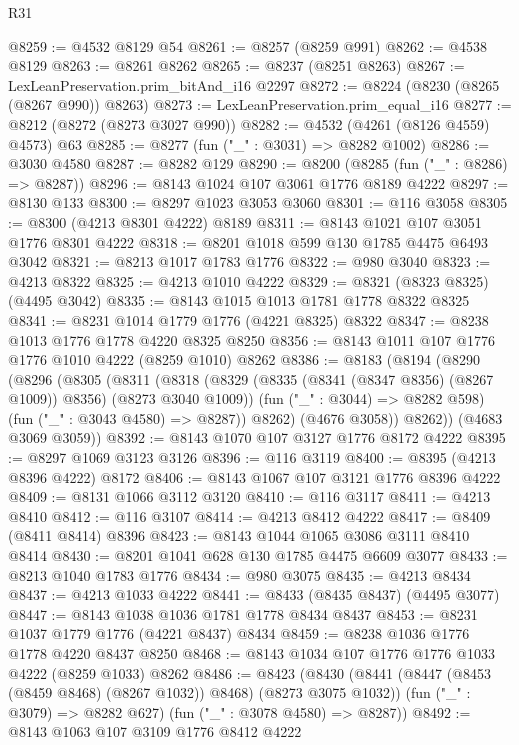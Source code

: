 \begin{lexlean}{R31}
\begin{coremodule}
@8259 := @4532 @8129 @54
@8261 := @8257 (@8259 @991)
@8262 := @4538 @8129
@8263 := @8261 @8262
@8265 := @8237 (@8251 @8263)
@8267 := LexLeanPreservation.prim_bitAnd_i16 @2297
@8272 := @8224 (@8230 (@8265 (@8267 @990)) @8263)
@8273 := LexLeanPreservation.prim_equal_i16
@8277 := @8212 (@8272 (@8273 @3027 @990))
@8282 := @4532 (@4261 (@8126 @4559) @4573) @63
@8285 := @8277 (fun ("_" : @3031) => @8282 @1002)
@8286 := @3030 @4580
@8287 := @8282 @129
@8290 := @8200 (@8285 (fun ("_" : @8286) => @8287))
@8296 := @8143 @1024 @107 @3061 @1776 @8189 @4222
@8297 := @8130 @133
@8300 := @8297 @1023 @3053 @3060
@8301 := @116 @3058
@8305 := @8300 (@4213 @8301 @4222) @8189
@8311 := @8143 @1021 @107 @3051 @1776 @8301 @4222
@8318 := @8201 @1018 @599 @130 @1785 @4475 @6493 @3042
@8321 := @8213 @1017 @1783 @1776
@8322 := @980 @3040
@8323 := @4213 @8322
@8325 := @4213 @1010 @4222
@8329 := @8321 (@8323 @8325) (@4495 @3042)
@8335 := @8143 @1015 @1013 @1781 @1778 @8322 @8325
@8341 := @8231 @1014 @1779 @1776 (@4221 @8325) @8322
@8347 := @8238 @1013 @1776 @1778 @4220 @8325 @8250
@8356 := @8143 @1011 @107 @1776 @1776 @1010 @4222 (@8259 @1010) @8262
@8386 := @8183
    (@8194
      (@8290
        (@8296
          (@8305
            (@8311
              (@8318
                (@8329 (@8335 (@8341 (@8347 @8356) (@8267 @1009)) @8356) (@8273 @3040 @1009))
                (fun ("_" : @3044) => @8282 @598)
                (fun ("_" : @3043 @4580) => @8287))
              @8262)
            (@4676 @3058))
          @8262))
      (@4683 @3069 @3059))
@8392 := @8143 @1070 @107 @3127 @1776 @8172 @4222
@8395 := @8297 @1069 @3123 @3126
@8396 := @116 @3119
@8400 := @8395 (@4213 @8396 @4222) @8172
@8406 := @8143 @1067 @107 @3121 @1776 @8396 @4222
@8409 := @8131 @1066 @3112 @3120
@8410 := @116 @3117
@8411 := @4213 @8410
@8412 := @116 @3107
@8414 := @4213 @8412 @4222
@8417 := @8409 (@8411 @8414) @8396
@8423 := @8143 @1044 @1065 @3086 @3111 @8410 @8414
@8430 := @8201 @1041 @628 @130 @1785 @4475 @6609 @3077
@8433 := @8213 @1040 @1783 @1776
@8434 := @980 @3075
@8435 := @4213 @8434
@8437 := @4213 @1033 @4222
@8441 := @8433 (@8435 @8437) (@4495 @3077)
@8447 := @8143 @1038 @1036 @1781 @1778 @8434 @8437
@8453 := @8231 @1037 @1779 @1776 (@4221 @8437) @8434
@8459 := @8238 @1036 @1776 @1778 @4220 @8437 @8250
@8468 := @8143 @1034 @107 @1776 @1776 @1033 @4222 (@8259 @1033) @8262
@8486 := @8423
    (@8430
      (@8441 (@8447 (@8453 (@8459 @8468) (@8267 @1032)) @8468) (@8273 @3075 @1032))
      (fun ("_" : @3079) => @8282 @627)
      (fun ("_" : @3078 @4580) => @8287))
@8492 := @8143 @1063 @107 @3109 @1776 @8412 @4222

\end{coremodule}
\end{lexlean}
